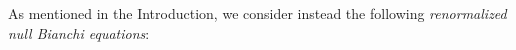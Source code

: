 \documentclass[11pt,reqno]{amsart}
\theoremstyle{definition}
\numberwithin{equation}{section}
\newcommand{\tr}{\mathrm{tr}}
\def\betab{\underline{\beta}}
\def\chib{\underline{\chi}}
\def\chibh{\widehat{\underline{\chi}}}
\def\chih{\widehat{\chi}}
\def\etab{\underline{\eta}}
\def\Lb{\underline{L}}
\def\tr{\mathrm{tr}}
\def\rhoc{\check{\rho}}
\def\sigmac{\check{\sigma}}
\def\tensor{\widehat{\otimes}}
\def\Lh{\widehat{L}}
\def\Lbh{\widehat{\underline{L}}}
\newcommand{\Db}{\underline{D}}
\def\nablas{\mbox{$\nabla \mkern -13mu /$ }}
\def\Deltas{\mbox{$\Delta \mkern -13mu /$ }}
\def\divs{\mbox{$\mathrm{div} \mkern -13mu /$ }}
\def\curls{\mbox{$\mathrm{curl} \mkern -13mu /$ }}
\def\ds{\mbox{$\nabla \mkern -13mu /$ }}
\begin{document}
As mentioned in the Introduction, we consider instead the following \textit{renormalized null Bianchi equations}:
\end{document}
